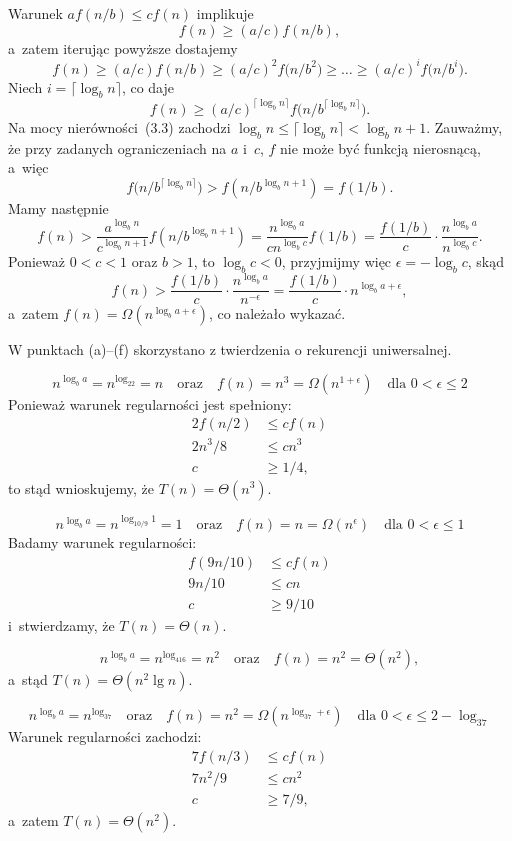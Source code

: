 \exercise %
Warunek $af(n/b)\le cf(n)$ implikuje
\[
	f(n) \ge (a/c)f(n/b),
\]
a~zatem iterując powyższe dostajemy
\[
	f(n) \ge (a/c)f(n/b) \ge (a/c)^2f\bigl(n/b^2\bigr) \ge \dots \ge (a/c)^if\bigl(n/b^i\bigr).
\]
Niech $i=\lceil\log_bn\rceil$, co daje
\[
	f(n) \ge (a/c)^{\lceil\log_bn\rceil}f\bigl(n/b^{\lceil\log_bn\rceil}\bigr).
\]
Na mocy nierówności~(3.3) zachodzi $\log_bn\le\lceil\log_b n\rceil<\log_bn+1$. Zauważmy, że przy zadanych ograniczeniach na $a$ i~$c$, $f$ nie może być funkcją nierosnącą, a~więc
\[
	f\bigl(n/b^{\lceil\log_bn\rceil}\bigr) > f(n/b^{\log_bn+1}) = f(1/b).
\]
Mamy następnie
\[
	f(n) > \frac{a^{\log_bn}}{c^{\log_bn+1}}f(n/b^{\log_bn+1}) = \frac{n^{\log_ba}}{cn^{\log_bc}}f(1/b) = \frac{f(1/b)}{c}\cdot\frac{n^{\log_ba}}{n^{\log_bc}}.
\]
Ponieważ $0<c<1$ oraz $b>1$, to $\log_bc<0$, przyjmijmy więc $\epsilon=-\log_bc$, skąd
\[
	f(n) > \frac{f(1/b)}{c}\cdot\frac{n^{\log_ba}}{n^{-\epsilon}} = \frac{f(1/b)}{c}\cdot n^{\log_ba+\epsilon},
\]
a~zatem $f(n)=\Omega(n^{\log_ba+\epsilon})$, co należało wykazać.

\problems

W punktach (a)\nobreakdash--(f) skorzystano z twierdzenia o rekurencji uniwersalnej.

\subproblem %
\[
	n^{\log_ba} = n^{\log_22} = n \quad\text{oraz}\quad f(n) = n^3 = \Omega(n^{1+\epsilon}) \quad\text{dla $0<\epsilon\le2$}
\]
Ponieważ warunek regularności jest spełniony:
\begin{align*}
	2f(n/2) &\le cf(n) \\
	2n^3\!/8 &\le cn^3 \\
	c &\ge 1/4,
\end{align*}
to stąd wnioskujemy, że $T(n)=\Theta(n^3)$.

\subproblem %
\[
	n^{\log_ba} = n^{\log_{10/9}1} = 1 \quad\text{oraz}\quad f(n) = n = \Omega(n^\epsilon) \quad\text{dla $0<\epsilon\le1$}
\]
Badamy warunek regularności:
\begin{align*}
	f(9n/10) &\le cf(n) \\
	9n/10 &\le cn \\
	c &\ge 9/10
\end{align*}
i~stwierdzamy, że $T(n)=\Theta(n)$.

\subproblem %
\[
	n^{\log_ba} = n^{\log_416} = n^2 \quad\text{oraz}\quad f(n) = n^2 = \Theta(n^2),
\]
a~stąd $T(n)=\Theta(n^2\lg n)$.

\subproblem %
\[
	n^{\log_ba} = n^{\log_37} \quad\text{oraz}\quad f(n) = n^2 = \Omega(n^{\log_37+\epsilon}) \quad\text{dla $0<\epsilon\le2-\log_37$}
\]
Warunek regularności zachodzi:
\begin{align*}
	7f(n/3) &\le cf(n) \\
	7n^2\!/9 &\le cn^2 \\
	c &\ge 7/9,
\end{align*}
a~zatem $T(n)=\Theta(n^2)$.

